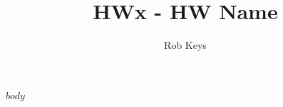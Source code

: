 \documentclass[12pt]{article}
\title{HWx - HW Name}
\author{Rob Keys}
\begin{document}
\maketitle

$body$
\end{document}
